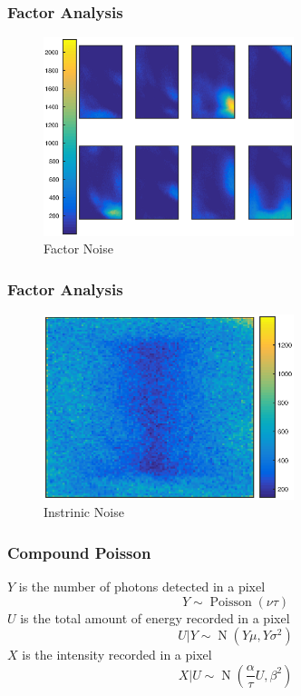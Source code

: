 \documentclass{beamer}
\DeclareMathOperator{\normal}{N}
\DeclareMathOperator{\poisson}{Poisson}
\begin{document}
\begin{frame}
\frametitle{Factor Analysis}
\begin{figure}
	\includegraphics[width = 0.65\textwidth]{figures/initial_factor_factorNoise.eps}
	\caption{Factor Noise}
\end{figure}
\end{frame}

\begin{frame}
\frametitle{Factor Analysis}
\begin{figure}
	\includegraphics[width = 0.65\textwidth]{figures/initial_factor_instrinicNoise.eps}
	\caption{Instrinic Noise}
\end{figure}
\end{frame}

\begin{frame}
\frametitle{Compound Poisson}
$Y$ is the number of photons detected in a pixel
\begin{equation}
Y\sim\poisson(\nu \tau)
\end{equation}
\pause
$U$ is the total amount of energy recorded in a pixel
\begin{equation}
U|Y\sim\normal\left(
Y\mu,Y\sigma^2
\right)
\end{equation}
\pause
$X$ is the intensity recorded in a pixel
\begin{equation}
X|U\sim\normal\left(
\frac{\alpha}{\tau}U,\beta^2
\right)
\end{equation}
\end{frame}
\end{document}
